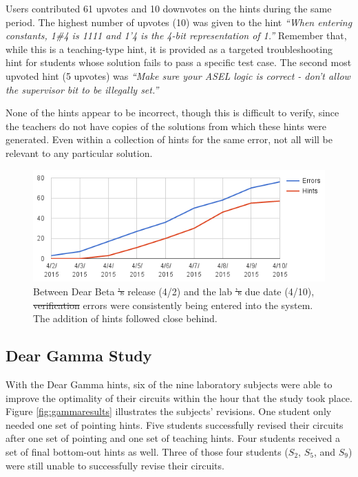 \documentclass[12pt,twoside]{mitthesis}
\providecommand{\DIFaddtex}[1]{{\protect\color{blue}\uwave{#1}}} %
\providecommand{\DIFdeltex}[1]{{\protect\color{red}\sout{#1}}}                      %
\providecommand{\DIFaddFL}[1]{\DIFadd{#1}} %
\providecommand{\DIFdelFL}[1]{\DIFdel{#1}} %
\providecommand{\DIFaddbeginFL}{} %
\providecommand{\DIFaddendFL}{} %
\providecommand{\DIFdelbeginFL}{} %
\providecommand{\DIFdelendFL}{} %
\providecommand{\DIFadd}[1]{\texorpdfstring{\DIFaddtex{#1}}{#1}} %
\providecommand{\DIFdel}[1]{\texorpdfstring{\DIFdeltex{#1}}{}} %
\begin{document}
Users contributed 61 upvotes and 10 downvotes on the hints during the same period. The highest number of upvotes (10) was given to the hint {\it ``When entering constants, 1\#4 is 1111 and 1'4 is the 4-bit representation of 1.''} Remember that, while this is a teaching-type hint, it is provided as a targeted troubleshooting hint for students whose solution fails to pass a specific test case. The second most upvoted hint (5 upvotes) was {\it ``Make sure your ASEL logic is correct - don't allow the supervisor bit to be illegally set.''} 

None of the hints appear to be incorrect, though this is difficult to verify, since the teachers do not have copies of the solutions from which these hints were generated. Even within a collection of hints for the same error, not all will be relevant to any particular solution.


\begin{figure}
\centering
\includegraphics[width=1.0\columnwidth]{Body/figures/classoverflow/cumulativeErrorsAndHints.png}
\caption{Between \DIFaddbeginFL \DIFaddFL{the }\DIFaddendFL Dear Beta \DIFdelbeginFL \DIFdelFL{'s }\DIFdelendFL release \DIFaddbeginFL \DIFaddFL{date }\DIFaddendFL (4/2) and the lab \DIFdelbeginFL \DIFdelFL{'s }\DIFdelendFL due date (4/10), \DIFdelbeginFL \DIFdelFL{verification }\DIFdelendFL \DIFaddbeginFL \DIFaddFL{autograder }\DIFaddendFL errors were consistently being entered into the system. The addition of hints followed close behind.}
\label{fig:betaengagement}
\end{figure}


\subsection{Dear Gamma Study}

With the Dear Gamma hints, six of the nine laboratory subjects were able to improve the optimality of their circuits within the hour that the study took place. Figure \ref{fig:gammaresults} illustrates the subjects' revisions. One student only needed one set of pointing hints. Five students successfully revised their circuits after one set of pointing and one set of teaching hints. Four students received a set of final bottom-out hints as well. Three of those four students ($S_2$, $S_5$, and $S_9$) were still unable to successfully revise their circuits. 
\end{document}
